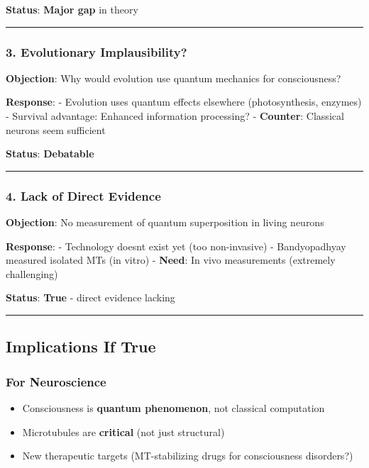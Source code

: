 \textbf{Status}: \textbf{Major gap} in theory

\begin{center}\rule{0.5\linewidth}{0.5pt}\end{center}

\subsubsection{3. Evolutionary
Implausibility?}\label{evolutionary-implausibility}

\textbf{Objection}: Why would evolution use quantum mechanics for
consciousness?

\textbf{Response}: - Evolution uses quantum effects elsewhere
(photosynthesis, enzymes) - Survival advantage: Enhanced information
processing? - \textbf{Counter}: Classical neurons seem sufficient

\textbf{Status}: \textbf{Debatable}

\begin{center}\rule{0.5\linewidth}{0.5pt}\end{center}

\subsubsection{4. Lack of Direct
Evidence}\label{lack-of-direct-evidence}

\textbf{Objection}: No measurement of quantum superposition in living
neurons

\textbf{Response}: - Technology doesn\textquotesingle t exist yet (too
non-invasive) - Bandyopadhyay measured isolated MTs (in vitro) -
\textbf{Need}: In vivo measurements (extremely challenging)

\textbf{Status}: \textbf{True} - direct evidence lacking

\begin{center}\rule{0.5\linewidth}{0.5pt}\end{center}

\subsection{Implications If True}\label{implications-if-true}

\subsubsection{For Neuroscience}\label{for-neuroscience}

\begin{itemize}
\tightlist
\item
  Consciousness is \textbf{quantum phenomenon}, not classical
  computation
\item
  Microtubules are \textbf{critical} (not just structural)
\item
  New therapeutic targets (MT-stabilizing drugs for consciousness
  disorders?)
\end{itemize}

